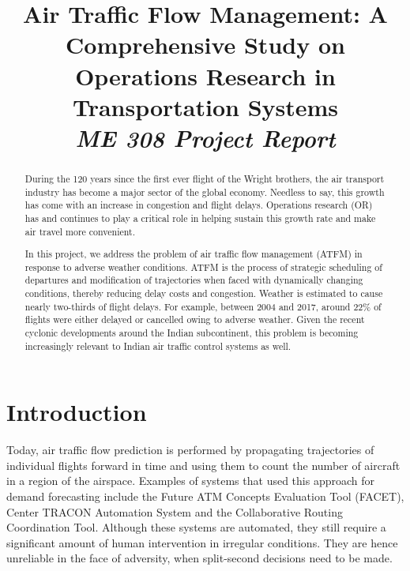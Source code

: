 \documentclass[conference]{IEEEtran}
\begin{document}
\title{{\huge\bf Air Traffic Flow Management: A Comprehensive Study on Operations Research in Transportation Systems}\\ {\Large\it ME 308 Project Report}}
\author{
\and
{}
\and
{}
\and
{}
}

\maketitle

\begin{abstract}
During the 120 years since the first ever flight of the Wright brothers, the air transport industry has become a major sector of the global economy. Needless to say, this growth has come with an increase in congestion and flight delays. Operations research (OR) has and continues to play a critical role in helping sustain this growth rate and make air travel more convenient.
\vspace{2mm}

In this project, we address the problem of air traffic flow management (ATFM) in response to adverse weather conditions. ATFM is the process of strategic scheduling of departures and modification of trajectories when faced with dynamically changing conditions, thereby reducing delay costs and congestion. Weather is estimated to cause nearly two-thirds of flight delays. For example, between 2004 and 2017, around 22\% of flights were either delayed or cancelled owing to adverse weather. Given the recent cyclonic developments around the Indian subcontinent, this problem is becoming increasingly relevant to Indian air traffic control systems as well.
\end{abstract}

\section{\large Introduction}
\label{sec:sec1}
\vspace{1mm}

Today, air traffic flow prediction is performed by propagating trajectories of individual flights forward in time and using them to count the number of aircraft in a region of the airspace. Examples of systems that used this approach for demand forecasting include the Future ATM Concepts Evaluation Tool (FACET), Center TRACON Automation System and the Collaborative Routing Coordination Tool. Although these systems are automated, they still require a significant amount of human intervention in irregular conditions. They are hence unreliable in the face of adversity, when split-second decisions need to be made.
\vspace{2mm}
\end{document}
